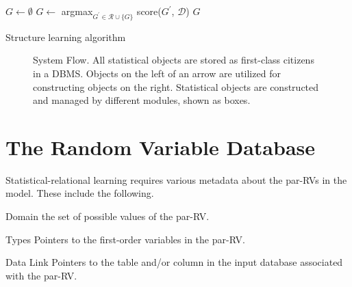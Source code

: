 \documentclass{IEEEtran}
\begin{document}
\begin{algorithm}[htbp]

\begin{algorithmic}[1]
\STATE $G \leftarrow 	\emptyset$
    \ENDFOR
	\STATE 	$G \leftarrow$ argmax$_{G^{\prime} \in \mathcal R\cup \{G\}}$ score($G^{\prime} $, $\mathcal D$)
\ENDWHILE
\STATE \Return $G$
\end{algorithmic}
\label{alg:learning}
\caption{Structure learning algorithm 
}
\end{algorithm}

%
\begin{figure}[t]
\begin{center}
\caption{System Flow. All statistical objects are stored as first-class citizens in a DBMS. Objects on the left of an arrow are utilized for constructing objects on the right. Statistical objects are constructed and managed by different modules, shown as boxes. 
\label{fig:architecture}}
\end{center}
\end{figure}



\section{The Random Variable Database} 

Statistical-relational learning requires various metadata about the par-RVs in the model. These include the following. 

\begin{LaTeXdescription}
\item[Domain] the set of possible values of the par-RV.
\item[Types] Pointers to the first-order variables
in the par-RV. 
\item[Data Link] Pointers to the table and/or column in the input database associated with the par-RV. 
\end{LaTeXdescription}
\end{document}
